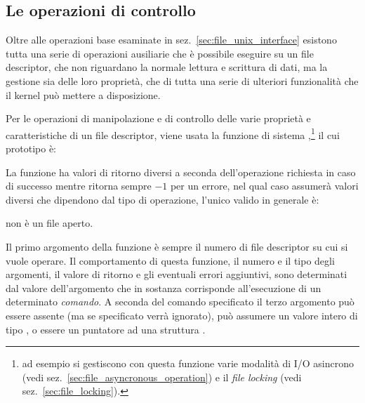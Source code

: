






\subsection{Le operazioni di controllo}
\label{sec:file_fcntl_ioctl}

Oltre alle operazioni base esaminate in sez.~\ref{sec:file_unix_interface}
esistono tutta una serie di operazioni ausiliarie che è possibile eseguire su
un file descriptor, che non riguardano la normale lettura e scrittura di dati,
ma la gestione sia delle loro proprietà, che di tutta una serie di ulteriori
funzionalità che il kernel può mettere a disposizione.


Per le operazioni di manipolazione e di controllo delle varie proprietà e
caratteristiche di un file descriptor, viene usata la funzione di sistema
,\footnote{ad esempio si gestiscono con questa funzione varie
  modalità di I/O asincrono (vedi sez.~\ref{sec:file_asyncronous_operation}) e
  il \textit{file locking} (vedi sez.~\ref{sec:file_locking}).} il cui
prototipo è:

\begin{funcproto}{
}

{La funzione ha valori di ritorno diversi a seconda dell'operazione richiesta
  in caso di successo mentre ritorna sempre $-1$ per un errore, nel qual caso
   assumerà valori diversi che dipendono dal tipo di operazione,
  l'unico valido in generale è:
  \begin{errlist}
  \item[\errcode{EBADF}]  non è un file aperto.
  \end{errlist}
}  
\end{funcproto}

Il primo argomento della funzione è sempre il numero di file descriptor
 su cui si vuole operare. Il comportamento di questa funzione, il
numero e il tipo degli argomenti, il valore di ritorno e gli eventuali errori
aggiuntivi, sono determinati dal valore dell'argomento  che in
sostanza corrisponde all'esecuzione di un determinato \textsl{comando}. A
seconda del comando specificato il terzo argomento può essere assente (ma se
specificato verrà ignorato), può assumere un valore intero di tipo
, o essere un puntatore ad una struttura .

